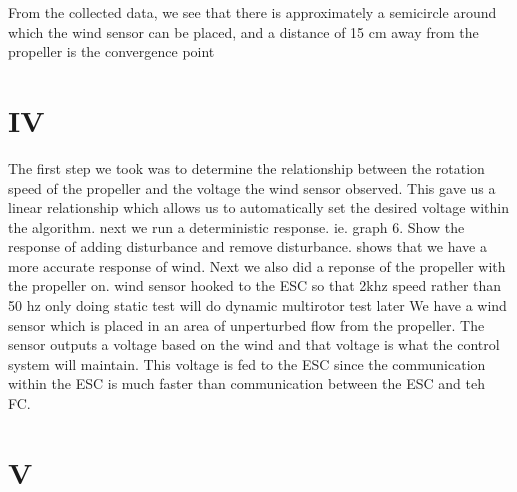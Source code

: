 \documentclass[twocolumn]{article}
\begin{document}
	
	From the collected data, we see that there is approximately a semicircle around which the wind sensor can be placed, and a distance of 15 cm away from the propeller is the convergence point 
	
	
	 
	\section{IV}
	The first step we took was to determine the relationship between the rotation speed of the propeller and the voltage the wind sensor observed. This gave us a linear relationship which allows us to automatically set the desired voltage within the algorithm. 
	next we run a deterministic response. ie. graph 6. Show the response of adding disturbance and remove disturbance. shows that we have a more accurate response of wind.
	Next we also did a reponse of the propeller with the propeller on.
	wind sensor hooked to the ESC so that 2khz speed rather than 50 hz
	only doing static test
	will do dynamic multirotor test later
	We have a wind sensor which is placed in an area of unperturbed flow from the propeller. The sensor outputs a voltage based on the wind and that voltage is what the control system will maintain. This voltage is fed to the ESC since the communication within the ESC is much faster than communication between the ESC and teh FC.  
	

	
	
	\section{V}
	
\end{document}
